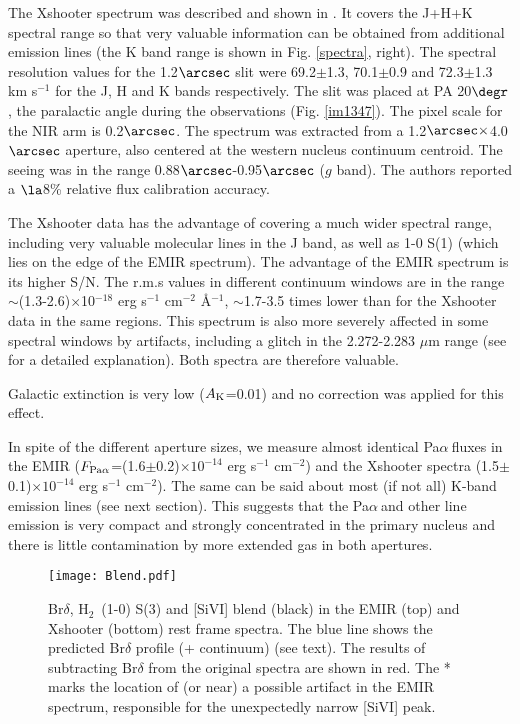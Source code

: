 \documentclass{aa}
\newcommand{\pa}{Pa$\alpha~$}
\newcommand{\hmol}{H$_2$~}
\begin{document}
The Xshooter spectrum was  described and shown in \cite{Rose2018}. It  covers  the J+H+K spectral range so that very valuable  information can be obtained from additional emission lines (the K band range is shown in Fig. \ref{spectra}, right).  The spectral resolution values for the 1.2$\arcsec$ slit  were 69.2$\pm$1.3,   70.1$\pm$0.9  and  72.3$\pm$1.3 km s$^{-1}$ for the J, H and K bands respectively. 
 The slit was placed at PA 20$\degr$, the paralactic angle during the observations   (Fig. \ref{im1347}). The pixel scale for the NIR arm is 0.2$\arcsec$. The spectrum was extracted from a 1.2$\arcsec\times$4.0$\arcsec$ aperture, also centered at the western nucleus continuum centroid. The seeing was in the range 0.88$\arcsec$-0.95$\arcsec$ ($g$ band). The authors reported a   $\la$8\% relative flux calibration accuracy. 





The Xshooter data has the advantage of covering a much wider spectral range, including  very valuable molecular lines in the J band, as well as 1-0 S(1) (which lies on the edge of the EMIR spectrum). The advantage of the EMIR spectrum is its higher S/N. The r.m.s values in different continuum windows are in the range $\sim$(1.3-2.6)$\times$10$^{-18}$ erg s$^{-1}$  cm$^{-2}$  \AA$^{-1}$, $\sim$1.7-3.5 times lower than for the Xshooter data in the same regions. This spectrum is also more severely affected in some spectral windows by artifacts, including a glitch  in the 2.272-2.283 $\mu$m range (see \cite{Rose2018} for a detailed explanation). Both spectra are therefore valuable.


Galactic extinction is very low ($A_{\rm K}$=0.01) and no correction  was applied for this effect. 




In spite of the different aperture sizes, we measure  almost identical  \pa fluxes in the EMIR  ($F_{\rm Pa\alpha}$=(1.6$\pm$0.2)$\times10^{-14}$   erg s$^{-1}$ cm$^{-2}$) and the Xshooter spectra (1.5$\pm$0.1)$\times10^{-14}$ erg s$^{-1}$ cm$^{-2}$).  The same can be said about most (if not all) K-band emission lines (see next section). This suggests that the \pa and other line emission is very compact and strongly concentrated in the primary nucleus and there is little contamination by more extended gas in both apertures.   

\begin{figure}
\centering
\texttt{[image: Blend.pdf]}
\caption{Br$\delta$, \hmol (1-0) S(3) and [SiVI] blend (black) in the EMIR (top) and Xshooter (bottom) rest frame spectra.  The blue line shows the predicted Br$\delta$ profile (+ continuum)  (see text). The results of subtracting   Br$\delta$ from the original spectra are shown in red. The * marks the location of  (or near) a possible artifact in the EMIR spectrum, responsible for the unexpectedly narrow [SiVI] peak.}
\label{sivi1}
\end{figure}
\end{document}
